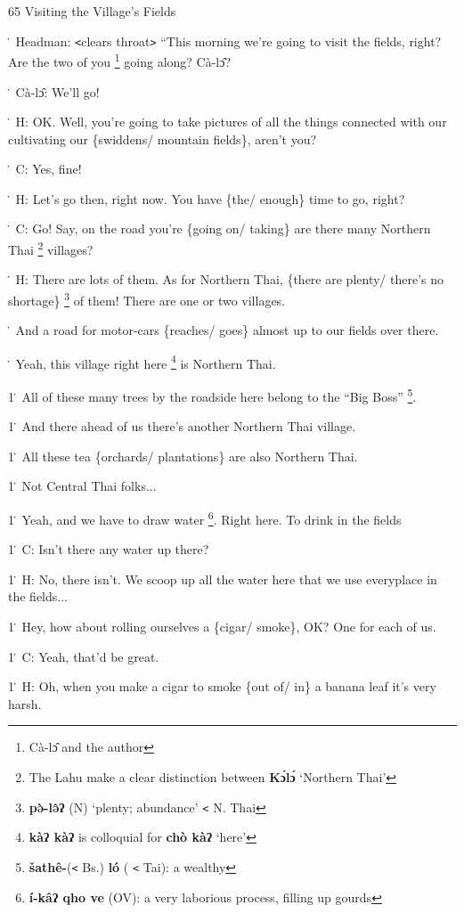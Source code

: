 
65 Visiting the Village's Fields

\. Headman: \texttt{<}clears throat\texttt{>} ``This morning we're going to visit
the fields, right? Are the two of you \footnote{Cà-lɔ̂ and the author} going along? Cà-lɔ̂?

\. Cà-lɔ̂: We'll go!

\. H: OK. Well, you're going to take pictures of all the things connected with
our cultivating our \{swiddens/ mountain fields\}, aren't you?

\. C: Yes, fine!

\. H: Let's go then, right now. You have \{the/ enough\} time to go, right?

\. C: Go! Say, on the road you're \{going on/ taking\} are there many Northern
Thai \footnote{The Lahu make a clear distinction between \textbf{Kɔ́lɔ́} `Northern Thai'} villages?

\. H: There are lots of them. As for Northern Thai, \{there are plenty/ there's
no shortage\} \footnote{\textbf{pə̀-lə̂ʔ} (N) `plenty; abundance' \texttt{<} N. Thai} of them! There are one or two villages.

\. And a road for motor-cars \{reaches/ goes\} almost up to our fields over there.

\. Yeah, this village right here \footnote{\textbf{ kàʔ kàʔ} is colloquial for\textbf{ chò kàʔ} `here'} is Northern Thai.

1\. All of these many trees by the roadside here belong to the ``Big Boss'' \footnote{\textbf{šathê-}(\texttt{<} Bs.) \textbf{ló} ( \texttt{<} Tai): a wealthy}.

1\. And there ahead of us there's another Northern Thai village.

1\. All these tea \{orchards/ plantations\} are also Northern Thai.

1\. Not Central Thai folks...

1\. Yeah, and we have to draw water \footnote{\textbf{ í-kâʔ qho ve} (OV): a very laborious process, filling up gourds}. Right here. To drink in the fields

1\. C: Isn't there any water up there?

1\. H: No, there isn't. We scoop up all the water here that we use everyplace in
the fields...

1\. Hey, how about rolling ourselves a \{cigar/ smoke\}, OK? One for each of us.

1\. C: Yeah, that'd be great.

1\. H: Oh, when you make a cigar to smoke \{out of/ in\} a banana leaf it's very
harsh.

